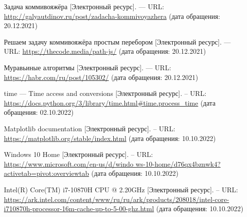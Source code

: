 
\renewcommand\bibname{Список использованных источников}
\begin{thebibliography}{}
  Задача коммивояжёра [Электронный ресурс]. --- URL: \url{http://galyautdinov.ru/post/zadacha-kommivoyazhera} (дата обращения: 20.12.2021)

 Решаем задачу коммивояжёра простым перебором [Электронный ресурс]. --- URL: \url{https://thecode.media/path-js/} (дата обращения: 20.12.2021)

 	Муравьиные алгоритмы [Электронный ресурс]. --- URL: \url{https://habr.com/ru/post/105302/} (дата обращения: 20.12.2021)


 time — Time access and conversions [Электронный ресурс]. -- URL: \url{https://docs.python.org/3/library/time.html#time.process_time} (дата обращения: 02.10.2022)

 Matplotlib documentation [Электронный ресурс]. -- URL: \url{https://matplotlib.org/stable/index.html} (дата обращения: 10.10.2022)

 Windows 10 Home [Электронный ресурс]. -- URL: \url{https://www.microsoft.com/en-us/d/windo ws-10-home/d76qx4bznwk4?activetab=pivot:overviewtab} (дата обращения: 10.10.2022)

 Intel(R) Core(TM) i7-10870H CPU @ 2.20GHz [Электронный ресурс]. -- URL: \url{https://ark.intel.com/content/www/ru/ru/ark/products/208018/intel-core-i710870h-processor-16m-cache-up-to-5-00-ghz.html} (дата обращения: 10.10.2022)

\end{thebibliography}